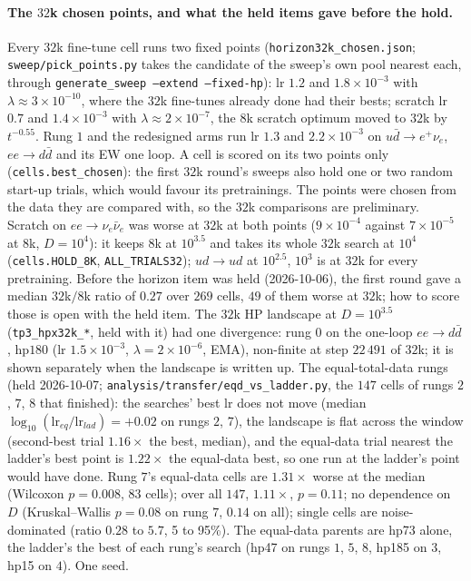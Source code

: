 \documentclass[11pt]{article}
\newcommand{\code}[1]{\texttt{#1}}
\begin{document}
\paragraph{The $32$k chosen points, and what the held items gave before the hold.} Every $32$k fine-tune cell runs two
fixed points (\code{horizon32k\_chosen.json}; \code{sweep/pick\_points.py} takes the candidate of the sweep's own pool
nearest each, through \code{generate\_sweep --extend --fixed-hp}): lr $1.2$ and $1.8\times10^{-3}$ with
$\lambda\approx3\times10^{-10}$, where the $32$k fine-tunes already done had their bests; scratch lr $0.7$ and
$1.4\times10^{-3}$ with $\lambda\approx2\times10^{-7}$, the $8$k scratch optimum moved to $32$k by $t^{-0.55}$. Rung $1$
and the redesigned arms run lr $1.3$ and $2.2\times10^{-3}$ on $u\bar d\to e^+\nu_e$, $ee\to d\bar d$ and its EW one loop.
A cell is scored on its two points only (\code{cells.best\_chosen}): the first $32$k round's sweeps also hold one or two
random start-up trials, which would favour its pretrainings. The points were chosen from the data they are compared
with, so the $32$k comparisons are preliminary. Scratch on $ee\to\nu_e\bar\nu_e$ was worse at $32$k at both points
($9\times10^{-4}$ against $7\times10^{-5}$ at $8$k, $D=10^4$): it keeps $8$k at $10^{3.5}$ and takes its whole $32$k search
at $10^4$ (\code{cells.HOLD\_8K}, \code{ALL\_TRIALS32}); $ud\to ud$ at $10^{2.5}$, $10^3$ is at $32$k for every pretraining.
Before the horizon item was held (2026-10-06), the first round gave a median $32$k$/8$k ratio of $0.27$ over $269$ cells,
$49$ of them worse at $32$k; how to score those is open with the held item. The $32$k HP landscape at $D=10^{3.5}$
(\code{tp3\_hpx32k\_*}, held with it) had one divergence: rung $0$ on the one-loop $ee\to d\bar d$, hp$180$ (lr
$1.5\times10^{-3}$, $\lambda=2\times10^{-6}$, EMA), non-finite at step $22\,491$ of $32$k; it is shown separately when the
landscape is written up. The equal-total-data rungs (held 2026-10-07; \code{analysis/transfer/eqd\_vs\_ladder.py}, the
$147$ cells of rungs $2$, $7$, $8$ that finished): the searches' best lr does not move (median
$\log_{10}(\mathrm{lr}_{eq}/\mathrm{lr}_{lad})=+0.02$ on rungs $2$, $7$), the landscape is flat across the window (second-best
trial $1.16\times$ the best, median), and the equal-data trial nearest the ladder's best point is $1.22\times$ the
equal-data best, so one run at the ladder's point would have done. Rung $7$'s equal-data cells are $1.31\times$ worse at
the median (Wilcoxon $p=0.008$, $83$ cells); over all $147$, $1.11\times$, $p=0.11$; no dependence on $D$
(Kruskal--Wallis $p=0.08$ on rung $7$, $0.14$ on all); single cells are noise-dominated (ratio $0.28$ to $5.7$, 5 to
95\%). The equal-data parents are hp73 alone, the ladder's the best of each rung's search (hp47 on rungs $1$, $5$, $8$,
hp185 on $3$, hp15 on $4$). One seed.
\end{document}
